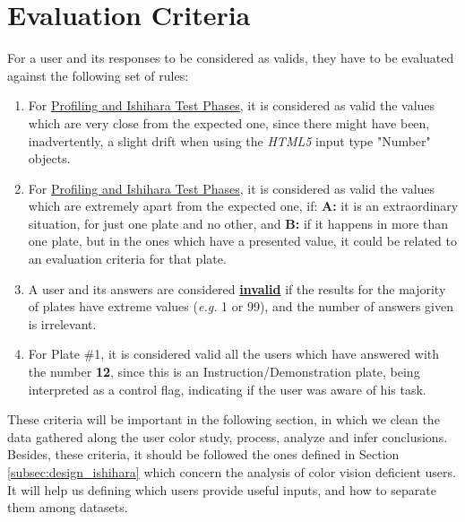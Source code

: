\section{Evaluation Criteria}
\label{sec:impl_evaluationcriteria}
%
For a user and its responses to be considered as valids, they have to be evaluated against the following set of rules:
%
\begin{enumerate}
	\item For \ul{Profiling and Ishihara Test Phases}, it is considered as valid the values which are very close from the expected one, since there might
	have been, inadvertently, a slight drift when using the \emph{HTML5} input type "Number" objects.
	\item For \ul{Profiling and Ishihara Test Phases}, it is considered as valid the values which are extremely apart from the expected one, if: \textbf{A:}
	it is an extraordinary situation, for just one plate and no other, and \textbf{B:} if it happens in more than one plate, but in the ones which have a
	presented value, it could be related to an evaluation criteria for that plate.
	\item A user and its answers are considered \textbf{\ul{invalid}} if the results for the majority of plates have extreme values (\emph{e.g.} 1 or 99), and
	the number of answers given is irrelevant.
	\item For Plate \#1, it is considered valid all the users which have answered with the number \textbf{12}, since this is an Instruction/Demonstration plate,
	being interpreted as a control flag, indicating if the user was aware of his task.
\end{enumerate}
%
These criteria will be important in the following section, in which we clean the data gathered along the user color study, process, analyze and infer conclusions.
Besides, these criteria, it should be followed the ones defined in Section \ref{subsec:design_ishihara} which concern the analysis of color vision deficient users.
It will help us defining which users provide useful inputs, and how to separate them among datasets.
